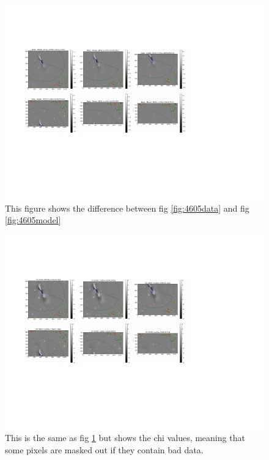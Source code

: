 \documentclass[12pt,preprint,pdftex]{aastex}
\begin{document}
\begin{figure}
\centering
\includegraphics[trim = 1cm 3.2cm 3.8cm 2.15cm,clip=true,width=\textwidth] {diff.pdf}
\caption{This figure shows the difference between fig \ref{fig:4605data} and fig \ref{fig:4605model}}
\label{fig:4605diff}
\end{figure}

\begin{figure}
\centering
\includegraphics[trim = 1cm 3.2cm 3.8cm 2.15cm,clip=true,width=\textwidth] {chi.pdf}
\caption{This is the same as fig \ref{fig:4605diff} but shows the chi values, meaning that some pixels are masked out if they contain bad data.}
\label{fig:4605chi}
\end{figure}
\end{document}
